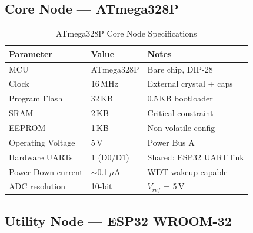 \documentclass[12pt,a4paper]{article}
\begin{document}
\subsection{Core Node --- ATmega328P}

\begin{table}[H]
\centering
\begin{tabular}{@{} L{4cm} L{4.5cm} L{4.5cm} @{}}
\toprule
\textbf{Parameter}   & \textbf{Value}         & \textbf{Notes}          \\
\midrule
MCU                  & ATmega328P             & Bare chip, DIP-28       \\
Clock                & 16\,MHz                & External crystal + caps \\
Program Flash        & 32\,KB                 & 0.5\,KB bootloader      \\
SRAM                 & 2\,KB                  & Critical constraint     \\
EEPROM               & 1\,KB                  & Non-volatile config     \\
Operating Voltage    & 5\,V                   & Power Bus A             \\
Hardware UARTs       & 1 (D0/D1)              & Shared: ESP32 UART link \\
Power-Down current   & $\sim$0.1\,$\mu$A      & WDT wakeup capable      \\
ADC resolution       & 10-bit                 & $V_{ref}$ = 5\,V        \\
\bottomrule
\end{tabular}
\caption{ATmega328P Core Node Specifications}
\end{table}

\subsection{Utility Node --- ESP32 WROOM-32}
\end{document}
